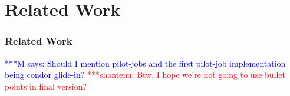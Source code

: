 \documentclass[times]{cpeauth}
\newcommand{\jhanote}[1]{ {\textcolor{red} { ***shantenu: #1 }}}
\newcommand{\mrnote}[1]{ {\textcolor{blue} { ***M says: #1 }}}
\newcommand{\pmnote}[1]{ {\textcolor{blue} { ***Pradeep: #1 }}}
\newcommand{\note}[1]{ {\textcolor{magenta} { ***Note: #1 }}}
\newcommand{\mrnote}[1]{}
\newcommand{\pmnote}[1]{}
\newcommand{\jhanote}[1]{}
\newcommand{\note}[1]{}
\begin{document}






\section{Related Work}


\subsubsection*{Related Work} 


\mrnote{Should I mention pilot-jobs and the first pilot-job implementation being condor glide-in?}
\jhanote{Btw, I hope we're not going to use bullet points in final version?}

\end{document}
